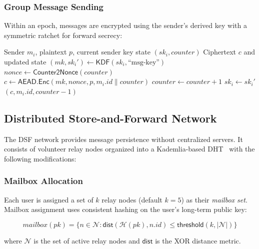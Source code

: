 \documentclass[11pt,a4paper]{article}
\newcommand{\HH}{\mathcal{H}}
\begin{document}
\subsubsection{Group Message Sending}

Within an epoch, messages are encrypted using the sender's derived key with a symmetric ratchet for forward secrecy:

\begin{algorithm}[H]
\caption{Group Message Send}
\label{alg:group-send}
\begin{algorithmic}[1]
\Require Sender $m_i$, plaintext $p$, current sender key state $(\mathit{sk}_i, \mathit{counter})$
\Ensure Ciphertext $c$ and updated state
\State $(\mathit{mk}, \mathit{sk}_i') \leftarrow \mathsf{KDF}(\mathit{sk}_i, \text{``msg-key''})$
\State $\mathit{nonce} \leftarrow \mathsf{Counter2Nonce}(\mathit{counter})$
\State $c \leftarrow \mathsf{AEAD}.\mathsf{Enc}(\mathit{mk}, \mathit{nonce}, p, m_i.\mathit{id} \| \mathit{counter})$
\State $\mathit{counter} \leftarrow \mathit{counter} + 1$
\State $\mathit{sk}_i \leftarrow \mathit{sk}_i'$
\State \Return $(c, m_i.\mathit{id}, \mathit{counter} - 1)$
\end{algorithmic}
\end{algorithm}

\subsection{Distributed Store-and-Forward Network}

The DSF network provides message persistence without centralized servers. It consists of volunteer relay nodes organized into a Kademlia-based DHT~\citep{maymounkov2002kademlia} with the following modifications:

\subsubsection{Mailbox Allocation}

Each user is assigned a set of $k$ relay nodes (default $k = 5$) as their \emph{mailbox set}. Mailbox assignment uses consistent hashing on the user's long-term public key:

\begin{equation}
    \mathit{mailbox}(pk) = \{ n \in \mathcal{N} : \mathsf{dist}(\HH(pk), n.\mathit{id}) \leq \mathsf{threshold}(k, |\mathcal{N}|) \}
\end{equation}

where $\mathcal{N}$ is the set of active relay nodes and $\mathsf{dist}$ is the XOR distance metric.
\end{document}
